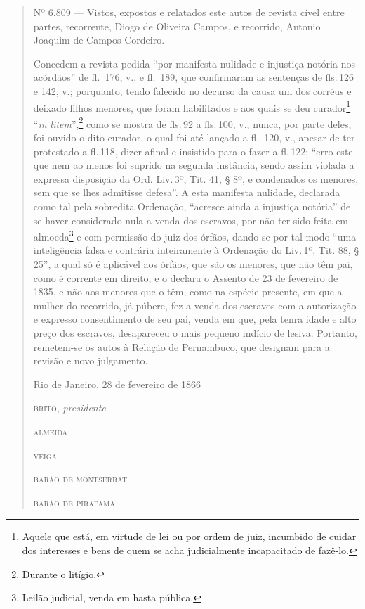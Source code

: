 \begin{quote}
Nº 6.809 --- Vistos, expostos e relatados este autos de revista cível
entre partes, recorrente, Diogo de Oliveira Campos, e recorrido, Antonio
Joaquim de Campos Cordeiro.

Concedem a revista pedida ``por manifesta nulidade e injustiça notória
nos acórdãos'' de fl.~176, v., e fl.~189, que confirmaram as sentenças de
fls.\,126 e 142, v.; porquanto, tendo falecido no decurso da causa um dos
corréus e deixado filhos menores, que foram habilitados e aos quais se
deu curador\footnote{Aquele que está, em virtude de lei ou por ordem
  de juiz, incumbido de cuidar dos interesses e bens de quem se acha
  judicialmente incapacitado de fazê-lo.} ``\textit{in litem}'',\footnote{Durante o
  litígio.} como se mostra de fls.\,92 a fls.\,100, v., nunca,
por parte deles, foi ouvido o dito curador, o qual foi até lançado a
fl.~120, v., apesar de ter protestado a fl.\,118, dizer afinal e
insistido para o fazer a fl.\,122; ``erro este que nem ao menos foi
suprido na segunda instância, sendo assim violada a expressa disposição
da Ord. Liv.\,3º, Tit. 41, § 8º, e condenados os menores, sem que se lhes
admitisse defesa''. A esta manifesta nulidade, declarada como tal pela
sobredita Ordenação, ``acresce ainda a injustiça notória'' de se haver
considerado nula a venda dos escravos, por não ter sido feita em
almoeda\footnote{Leilão judicial, venda em hasta pública.} e com
permissão do juiz dos órfãos, dando-se por tal modo ``uma inteligência
falsa e contrária inteiramente à Ordenação do Liv.\,1º, Tit. 88, § 25'', a
qual só é aplicável aos órfãos, que são os menores, que não têm pai,
como é corrente em direito, e o declara o Assento de 23 de fevereiro de
1835, e não aos menores que o têm, como na espécie presente, em que a
mulher do recorrido, já púbere, fez a venda dos escravos com a
autorização e expresso consentimento de seu pai, venda em que, pela
tenra idade e alto preço dos escravos, desapareceu o mais pequeno
indício de lesiva. Portanto, remetem-se os autos à Relação de
Pernambuco, que designam para a revisão e novo julgamento.

\begin{flushright}
Rio de Janeiro, 28 de fevereiro de 1866

\textsc{brito}, \emph{presidente}

\textsc{almeida}

\textsc{veiga}

\textsc{barão de montserrat}

\textsc{barão de pirapama}


\end{flushright}
\end{quote}
